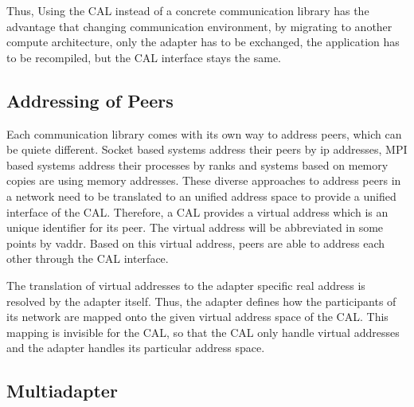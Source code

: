 Thus, Using the CAL instead of a concrete communication library has
the advantage that changing communication environment, by migrating to
another compute architecture, only the adapter has to be exchanged,
the application has to be recompiled, but the CAL interface stays the
same.


\subsection{Addressing of Peers}
Each communication library comes with its own way to address peers,
which can be quiete different. Socket based systems address their
peers by ip addresses, MPI based systems address their processes by
ranks and systems based on memory copies are using memory addresses.
These diverse approaches to address peers in a network need to be
translated to an unified address space to provide a unified interface of the CAL.
Therefore, a CAL provides a virtual address which is an unique
identifier for its peer. The virtual address
will be abbreviated in some points by vaddr. Based on this virtual
address, peers are able to address each other through the CAL
interface.

The translation of virtual addresses to the adapter specific real address
is resolved by the adapter itself. Thus, the adapter defines how the participants
of its network are mapped onto the given virtual address space of the CAL. This
mapping is invisible for the CAL, so that the CAL only handle virtual addresses
and the adapter handles its particular address space.


\subsection{Multiadapter}

